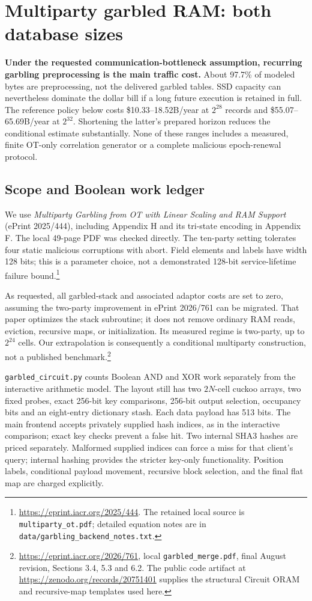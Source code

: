 
\section{Multiparty garbled RAM: both database sizes}
\label{sec:garbled}
\textbf{Under the requested communication-bottleneck assumption, recurring
garbling preprocessing is the main traffic cost.} About 97.7\% of modeled bytes
are preprocessing, not the delivered garbled tables. SSD capacity can nevertheless
dominate the dollar bill if a long future execution is retained in full. The
reference policy below costs \$10.33--18.52B/year at $2^{28}$ records and
\$55.07--65.69B/year at $2^{32}$. Shortening the latter's prepared horizon reduces the
conditional estimate substantially. None of these ranges includes a measured,
finite OT-only correlation generator or a complete malicious epoch-renewal protocol.

\subsection{Scope and Boolean work ledger}
We use \emph{Multiparty Garbling from OT with Linear Scaling and RAM Support}
(ePrint 2025/444), including Appendix H and its tri-state encoding in Appendix F.
The local 49-page PDF was checked directly. The ten-party setting tolerates four
static malicious corruptions with abort. Field elements and labels have width
128 bits; this is a parameter choice, not a demonstrated 128-bit service-lifetime
failure bound.\footnote{\url{https://eprint.iacr.org/2025/444}. The retained local
source is \texttt{multiparty\_ot.pdf}; detailed equation notes are in
\texttt{data/garbling\_backend\_notes.txt}.}

As requested, all garbled-stack and associated adaptor costs are set to zero,
assuming the two-party improvement in ePrint 2026/761 can be migrated. That paper
optimizes the stack subroutine; it does not remove ordinary RAM reads, eviction,
recursive maps, or initialization. Its measured regime is two-party, up to
$2^{24}$ cells. Our extrapolation is consequently a conditional multiparty
construction, not a published benchmark.\footnote{\url{https://eprint.iacr.org/2026/761},
local \texttt{garbled\_merge.pdf}, final August revision, Sections 3.4, 5.3 and 6.2.
The public code artifact at \url{https://zenodo.org/records/20751401} supplies
the structural Circuit ORAM and recursive-map templates used here.}

\texttt{garbled\_circuit.py} counts Boolean AND and XOR work separately from the
interactive arithmetic model. The layout still has two $2N$-cell cuckoo arrays,
two fixed probes, exact 256-bit key comparisons, 256-bit output selection,
occupancy bits and an eight-entry dictionary stash. Each data payload has
513 bits. The main frontend accepts privately supplied hash indices, as in the
interactive comparison; exact key checks prevent a false hit. Two internal SHA3
hashes are priced separately. Malformed supplied indices can force a miss for
that client's query; internal hashing provides the stricter key-only functionality.
Position labels, conditional payload movement,
recursive block selection, and the final flat map are charged explicitly.

